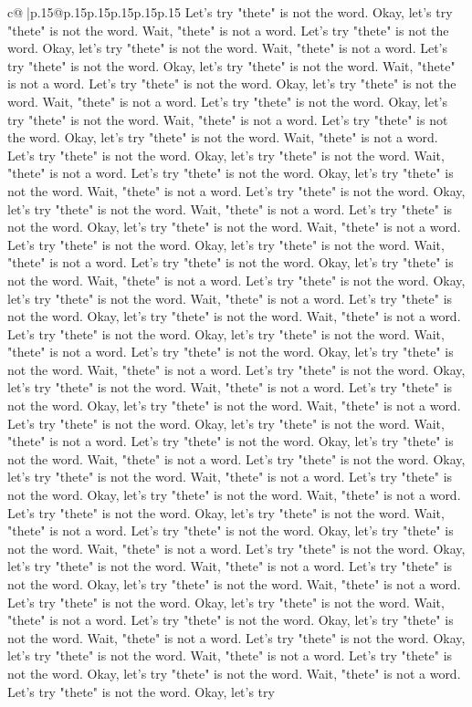 \documentclass{article}
\begin{document}
{\begin{supertabular}{c@{$\;$}|p{.15\linewidth}@{}p{.15\linewidth}p{.15\linewidth}p{.15\linewidth}p{.15\linewidth}p{.15\linewidth}}
{{{Let's try "thete" is not the word. Okay, let's try "thete" is not the word. Wait, "thete" is not a word. Let's try "thete" is not the word. Okay, let's try "thete" is not the word. Wait, "thete" is not a word. Let's try "thete" is not the word. Okay, let's try "thete" is not the word. Wait, "thete" is not a word. Let's try "thete" is not the word. Okay, let's try "thete" is not the word. Wait, "thete" is not a word. Let's try "thete" is not the word. Okay, let's try "thete" is not the word. Wait, "thete" is not a word. Let's try "thete" is not the word. Okay, let's try "thete" is not the word. Wait, "thete" is not a word. Let's try "thete" is not the word. Okay, let's try "thete" is not the word. Wait, "thete" is not a word. Let's try "thete" is not the word. Okay, let's try "thete" is not the word. Wait, "thete" is not a word. Let's try "thete" is not the word. Okay, let's try "thete" is not the word. Wait, "thete" is not a word. Let's try "thete" is not the word. Okay, let's try "thete" is not the word. Wait, "thete" is not a word. Let's try "thete" is not the word. Okay, let's try "thete" is not the word. Wait, "thete" is not a word. Let's try "thete" is not the word. Okay, let's try "thete" is not the word. Wait, "thete" is not a word. Let's try "thete" is not the word. Okay, let's try "thete" is not the word. Wait, "thete" is not a word. Let's try "thete" is not the word. Okay, let's try "thete" is not the word. Wait, "thete" is not a word. Let's try "thete" is not the word. Okay, let's try "thete" is not the word. Wait, "thete" is not a word. Let's try "thete" is not the word. Okay, let's try "thete" is not the word. Wait, "thete" is not a word. Let's try "thete" is not the word. Okay, let's try "thete" is not the word. Wait, "thete" is not a word. Let's try "thete" is not the word. Okay, let's try "thete" is not the word. Wait, "thete" is not a word. Let's try "thete" is not the word. Okay, let's try "thete" is not the word. Wait, "thete" is not a word. Let's try "thete" is not the word. Okay, let's try "thete" is not the word. Wait, "thete" is not a word. Let's try "thete" is not the word. Okay, let's try "thete" is not the word. Wait, "thete" is not a word. Let's try "thete" is not the word. Okay, let's try "thete" is not the word. Wait, "thete" is not a word. Let's try "thete" is not the word. Okay, let's try "thete" is not the word. Wait, "thete" is not a word. Let's try "thete" is not the word. Okay, let's try "thete" is not the word. Wait, "thete" is not a word. Let's try "thete" is not the word. Okay, let's try "thete" is not the word. Wait, "thete" is not a word. Let's try "thete" is not the word. Okay, let's try "thete" is not the word. Wait, "thete" is not a word. Let's try "thete" is not the word. Okay, let's try "thete" is not the word. Wait, "thete" is not a word. Let's try "thete" is not the word. Okay, let's try "thete" is not the word. Wait, "thete" is not a word. Let's try "thete" is not the word. Okay, let's try "thete" is not the word. Wait, "thete" is not a word. Let's try "thete" is not the word. Okay, let's try "thete" is not the word. Wait, "thete" is not a word. Let's try "thete" is not the word. Okay, let's try }}}
\end{supertabular}}
\end{document}
